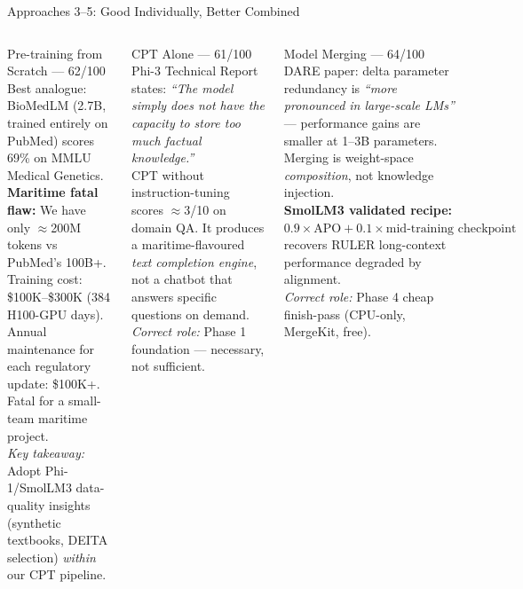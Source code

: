 \documentclass[aspectratio=169,11pt]{beamer}
\begin{document}
\begin{frame}[shrink=18]{Approaches 3--5: Good Individually, Better Combined}
\begin{columns}[T]

\begin{block}{Pre-training from Scratch --- 62/100}
  \scriptsize\RaggedRight
  Best analogue: BioMedLM (2.7B, trained entirely on PubMed) scores
  69\% on MMLU Medical Genetics.\\[2pt]
  \textbf{Maritime fatal flaw:} We have only $\approx$200M tokens vs
  PubMed's 100B+.  Training cost: \$100K--\$300K (384 H100-GPU days).\\[2pt]
  Annual maintenance for each regulatory update: \$100K+. Fatal for a
  small-team maritime project.\\[2pt]
  \textit{Key takeaway:} Adopt Phi-1/SmolLM3 data-quality insights
  (synthetic textbooks, DEITA selection) \emph{within} our CPT pipeline.
\end{block}

\vspace{4pt}
\begin{block}{CPT Alone --- 61/100}
  \scriptsize\RaggedRight
  Phi-3 Technical Report states: \textit{``The model simply does not have
  the capacity to store too much factual knowledge.''}\\[2pt]
  CPT without instruction-tuning scores $\approx$3/10 on domain QA.
  It produces a maritime-flavoured \emph{text completion engine},
  not a chatbot that answers specific questions on demand.\\[2pt]
  \textit{Correct role:} Phase 1 foundation --- necessary, not sufficient.
\end{block}


\begin{block}{Model Merging --- 64/100}
  \scriptsize\RaggedRight
  DARE paper: delta parameter redundancy is \textit{``more pronounced in
  large-scale LMs''} --- performance gains are smaller at 1--3B parameters.
  Merging is weight-space \emph{composition}, not knowledge injection.\\[2pt]
  \textbf{SmolLM3 validated recipe:}
  $0.9 \times \text{APO} + 0.1 \times \text{mid-training checkpoint}$
  recovers RULER long-context performance degraded by alignment.\\[2pt]
  \textit{Correct role:} Phase 4 cheap finish-pass (CPU-only, MergeKit, free).
\end{block}


\end{columns}
\end{frame}
\end{document}
